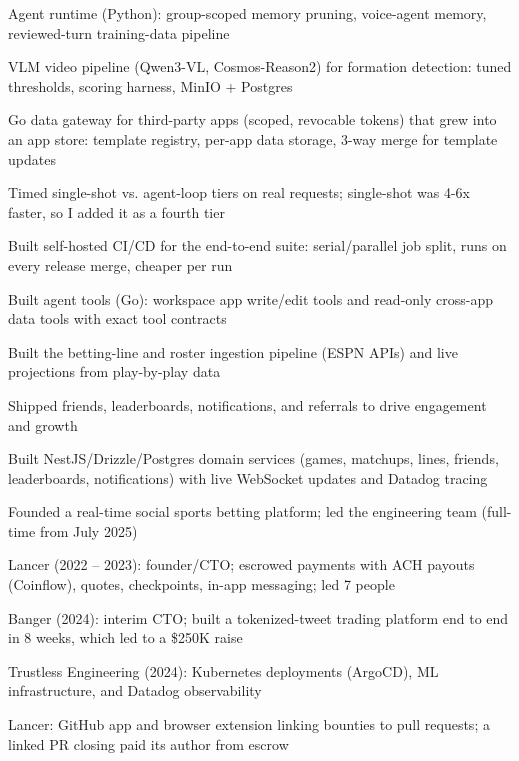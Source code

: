 \documentclass[print]{jack-resume}
\begin{document}
\begin{tightemize}
    \item Agent runtime (Python): group-scoped memory pruning, voice-agent memory, reviewed-turn training-data pipeline
    \item VLM video pipeline (Qwen3-VL, Cosmos-Reason2) for formation detection: tuned thresholds, scoring harness, MinIO + Postgres
    \item Go data gateway for third-party apps (scoped, revocable tokens) that grew into an app store: template registry, per-app data storage, 3-way merge for template updates
    \item Timed single-shot vs. agent-loop tiers on real requests; single-shot was 4-6x faster, so I added it as a fourth tier
    \item Built self-hosted CI/CD for the end-to-end suite: serial/parallel job split, runs on every release merge, cheaper per run
    \item Built agent tools (Go): workspace app write/edit tools and read-only cross-app data tools with exact tool contracts
\end{tightemize}
\sectionsep

\begin{tightemize}
    \item Built the betting-line and roster ingestion pipeline (ESPN APIs) and live projections from play-by-play data
    \item Shipped friends, leaderboards, notifications, and referrals to drive engagement and growth
    \item Built NestJS/Drizzle/Postgres domain services (games, matchups, lines, friends, leaderboards, notifications) with live WebSocket updates and Datadog tracing
    \item Founded a real-time social sports betting platform; led the engineering team (full-time from July 2025)
\end{tightemize}
\sectionsep

\begin{tightemize}
    \item Lancer (2022 -- 2023): founder/CTO; escrowed payments with ACH payouts (Coinflow), quotes, checkpoints, in-app messaging; led 7 people
    \item Banger (2024): interim CTO; built a tokenized-tweet trading platform end to end in 8 weeks, which led to a \$250K raise
    \item Trustless Engineering (2024): Kubernetes deployments (ArgoCD), ML infrastructure, and Datadog observability
    \item Lancer: GitHub app and browser extension linking bounties to pull requests; a linked PR closing paid its author from escrow
\end{tightemize}
\sectionsep
\end{document}
